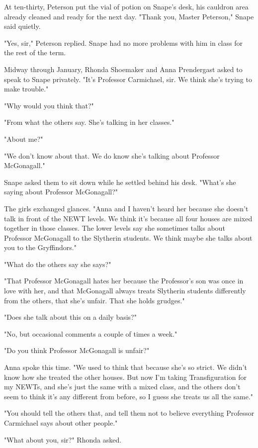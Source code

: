 \documentclass[a4paper,11pt]{article}
\begin{document}
At ten-thirty, Peterson put the vial of potion on Snape's desk, his cauldron area already cleaned and ready for the next day. "Thank you, Master Peterson," Snape said quietly.

"Yes, sir," Peterson replied. Snape had no more problems with him in class for the rest of the term.

Midway through January, Rhonda Shoemaker and Anna Prendergast asked to speak to Snape privately. "It's Professor Carmichael, sir. We think she's trying to make trouble."

"Why would you think that?"

"From what the others say. She's talking in her classes."

"About me?"

"We don't know about that. We do know she's talking about Professor McGonagall."

Snape asked them to sit down while he settled behind his desk. "What's she saying about Professor McGonagall?"

The girls exchanged glances. "Anna and I haven't heard her because she doesn't talk in front of the NEWT levels. We think it's because all four houses are mixed together in those classes. The lower levels say she sometimes talks about Professor McGonagall to the Slytherin students. We think maybe she talks about you to the Gryffindors."

"What do the others say she says?"

"That Professor McGonagall hates her because the Professor's son was once in love with her, and that McGonagall always treats Slytherin students differently from the others, that she's unfair. That she holds grudges."

"Does she talk about this on a daily basis?"

"No, but occasional comments a couple of times a week."

"Do you think Professor McGonagall is unfair?"

Anna spoke this time. "We used to think that because she's so strict. We didn't know how she treated the other houses. But now I'm taking Transfiguration for my NEWTs, and she's just the same with a mixed class, and the others don't seem to think it's any different from before, so I guess she treats us all the same."

"You should tell the others that, and tell them not to believe everything Professor Carmichael says about other people."

"What about you, sir?" Rhonda asked.
\end{document}
